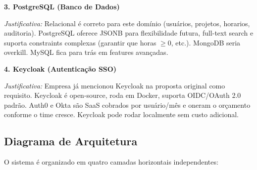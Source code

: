 \documentclass[12pt,a4paper]{article}
\begin{document}
\begin{caixaazul}
\textbf{3. PostgreSQL (Banco de Dados)}

\textit{Justificativa:} Relacional é correto para este domínio (usuários, projetos, hora\-rios,
auditoria). PostgreSQL oferece JSONB para flexibilidade futura, full-text search e suporta
constraints complexas (garantir que horas $\geq 0$, etc.). MongoDB seria overkill. MySQL fica
para trás em features avançadas.
\end{caixaazul}

\begin{caixaazul}
\textbf{4. Keycloak (Autenticação SSO)}

\textit{Justificativa:} Empresa já mencionou Keycloak na proposta original como requisito.
Keycloak é open-source, roda em Docker, suporta OIDC/OAuth 2.0 padrão. Auth0 e Okta são
SaaS cobrados por usuário/mês e oneram o orçamento conforme o time cresce. Keycloak pode
rodar localmente sem custo adicional.
\end{caixaazul}

\subsection{Diagrama de Arquitetura}

O sistema é organizado em quatro camadas horizontais independentes:
\end{document}
